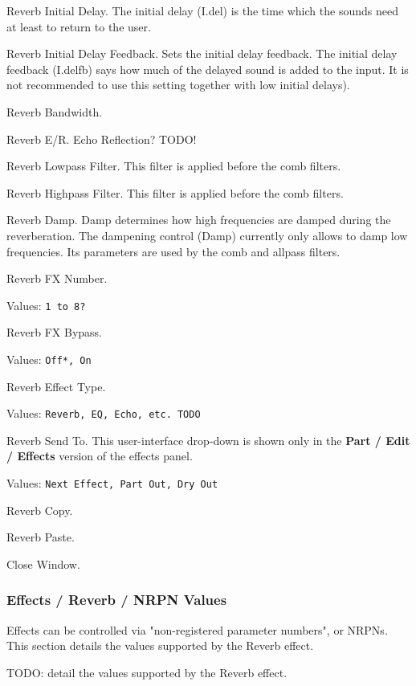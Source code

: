    Reverb Initial Delay.
   The initial delay (I.del) is the time which the sounds need at least to
   return to the user.

   Reverb Initial Delay Feedback.
   Sets the initial delay feedback.
   The initial delay feedback (I.delfb) says how much
   of the delayed sound is added to the input.
   It is not recommended to use this setting together with
   low initial delays).

   Reverb Bandwidth.

   Reverb E/R.
   Echo Reflection?  TODO!

   Reverb Lowpass Filter.
   This filter is applied before the comb filters.

   Reverb Highpass Filter.
   This filter is applied before the comb filters.

   Reverb Damp.
   Damp determines how high frequencies are damped during the
   reverberation.  The dampening control (Damp) currently only allows to
   damp low frequencies. Its parameters are used by the comb and allpass
   filters.

   Reverb FX Number.

   Values: \texttt{1 to 8?}

   Reverb FX Bypass.

   Values: \texttt{Off*, On}

   Reverb Effect Type.

   Values: \texttt{Reverb, EQ, Echo, etc. TODO}

   Reverb Send To.
   This user-interface drop-down is shown only in the
   \textbf{Part / Edit / Effects} version of the effects panel.

   Values: \texttt{Next Effect, Part Out, Dry Out}

   Reverb Copy.

   Reverb Paste.

   Close Window.

\subsubsection{Effects / Reverb / NRPN Values}
\label{subsubsec:effects_edit_reverb_nrpn}

   Effects can be controlled via "non-registered parameter numbers", or NRPNs.
   This section details the values supported by the Reverb effect.

   TODO:  detail the values supported by the Reverb effect.

